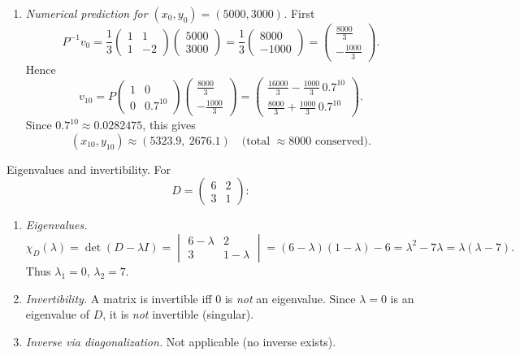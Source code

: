 \documentclass[11pt]{article}
\def\textbf#1{#1}%
\def\mathbf#1{#1}%
\begin{document}
\begin{solution}
\begin{enumerate}
\item \emph{Numerical prediction for $(x_0,y_0)=(5000,3000)$.} First
\[
P^{-1}\mathbf{v}_0
=\frac13\begin{pmatrix}1&1\\[2pt]1&-2\end{pmatrix}\!\begin{pmatrix}5000\\[2pt]3000\end{pmatrix}
=\frac13\begin{pmatrix}8000\\[2pt]-1000\end{pmatrix}
=\begin{pmatrix}\tfrac{8000}{3}\\[2pt]-\tfrac{1000}{3}\end{pmatrix}.
\]
Hence
\[
\mathbf{v}_{10}
= P\begin{pmatrix}1&0\\[2pt]0&0.7^{10}\end{pmatrix}
\begin{pmatrix}\tfrac{8000}{3}\\[2pt]-\tfrac{1000}{3}\end{pmatrix}
= \begin{pmatrix}
\frac{16000}{3}-\frac{1000}{3}\,0.7^{10}\\[5pt]
\frac{8000}{3}+\frac{1000}{3}\,0.7^{10}
\end{pmatrix}.
\]
Since $0.7^{10}\approx 0.0282475$, this gives
\[
(x_{10},y_{10})\approx (5323.9,\ 2676.1)\quad\text{(total $\approx 8000$ conserved).}
\]
\end{enumerate}
\end{solution}


\begin{solution}
\textbf{Eigenvalues and invertibility.} For
\[
D=\begin{pmatrix}6&2\\[2pt]3&1\end{pmatrix}:
\]
\begin{enumerate}
\item \emph{Eigenvalues.}
\[
\chi_D(\lambda)=\det(D-\lambda I)
=\begin{vmatrix}6-\lambda&2\\[2pt]3&1-\lambda\end{vmatrix}
=(6-\lambda)(1-\lambda)-6
=\lambda^2-7\lambda
=\lambda(\lambda-7).
\]
Thus $\lambda_1=0$, $\lambda_2=7$.

\item \emph{Invertibility.} A matrix is invertible iff $0$ is \emph{not} an eigenvalue.
Since $\lambda=0$ is an eigenvalue of $D$, it is \emph{not} invertible (singular).

\item \emph{Inverse via diagonalization.} Not applicable (no inverse exists).
\end{enumerate}
\end{solution}
\end{document}
